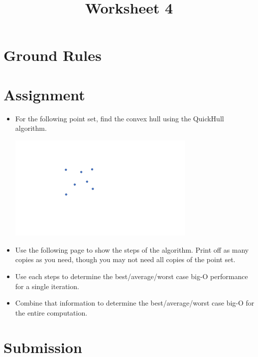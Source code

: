 \documentclass[a4paper,12pt]{article}
\title{Worksheet 4}
\begin{document}
\maketitle


\vspace{5pt}
\section{Ground Rules}


\vspace{5pt}
\section{Assignment}

\begin{itemize}
\item For the following point set, find the convex hull using the QuickHull algorithm. 

\begin{center}
\includegraphics[width=9cm]{../images/chull.pdf}
\end{center}

\item Use the following page to show the steps of the algorithm. Print off as many copies as you need, though you may not need all copies of the point set. 

\item Use each steps to determine the best/average/worst case big-O performance for a single iteration. 
\item Combine that information to determine the best/average/worst case big-O for the entire computation.

\end{itemize}


\section{Submission}
\end{document}
